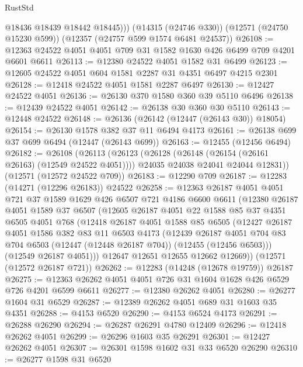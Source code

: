 \begin{lexlean}{RustStd}
\begin{coremodule}
          @18436
          @18439
          @18442
          @18445)))
    (@14315 (@24746 @330))
    (@12571 (@24750 @15230 @599))
    (@12357 (@24757 @599 @1574 @6481 @24537))
@26108 := @12363 @24522 @4051 @4051 @709 @31 @1582 @1630 @426 @6499 @709 @4201 @6601 @6611
@26113 := @12380 @24522 @4051 @1582 @31 @6499
@26123 := @12605 @24522 @4051 @604 @1581 @2287 @31 @4351 @6497 @4215 @2301
@26128 := @12418 @24522 @4051 @1581 @2287 @6497
@26130 := @12427 @24522 @4051
@26136 := @26130 @370 @1580 @360 @39 @5110 @6496
@26138 := @12439 @24522 @4051
@26142 := @26138 @30 @360 @30 @5110
@26143 := @12448 @24522
@26148 := @26136 (@26142 (@12447 (@26143 @30)) @18054)
@26154 := @26130 @1578 @382 @37 @11 @6494 @4173
@26161 := @26138 @699 @37 @699 @6494 (@12447 (@26143 @699))
@26163 := @12455 (@12456 @6494)
@26182 := @26108
    (@26113
      (@26123
        (@26128 (@26148 (@26154 (@26161 @26163) (@12549 @24522 @4051))))
        @24035
        @24038
        @24041
        @24044
        @12831))
    (@12571 (@12572 @24522 @709))
@26183 := @12290 @709
@26187 := @12283 (@14271 (@12296 @26183)) @24522
@26258 := @12363
    @26187
    @4051
    @4051
    @721
    @37
    @1589
    @1629
    @426
    @6507
    @721
    @4186
    @6600
    @6611
    (@12380
      @26187
      @4051
      @1589
      @37
      @6507
      (@12605
        @26187
        @4051
        @22
        @1588
        @85
        @37
        @4351
        @6505
        @4051
        @768
        (@12418
          @26187
          @4051
          @1588
          @85
          @6505
          (@12427
            @26187
            @4051
            @1586
            @382
            @83
            @11
            @6503
            @4173
            (@12439
              @26187
              @4051
              @704
              @83
              @704
              @6503
              (@12447 (@12448 @26187 @704))
              (@12455 (@12456 @6503)))
            (@12549 @26187 @4051)))
        @12647
        @12651
        @12655
        @12662
        @12669))
    (@12571 (@12572 @26187 @721))
@26262 := @12283 (@14248 (@12678 @19759)) @26187
@26275 := @12363 @26262 @4051 @4051 @726 @31 @1604 @1628 @426 @6529 @726 @4201 @6599 @6611
@26277 := @12380 @26262 @4051
@26280 := @26277 @1604 @31 @6529
@26287 := @12389 @26262 @4051 @689 @31 @1603 @35 @4351
@26288 := @4153 @6520
@26290 := @4153 @6524 @4173
@26291 := @26288 @26290
@26294 := @26287 @26291 @4780 @12409
@26296 := @12418 @26262 @4051
@26299 := @26296 @1603 @35 @26291
@26301 := @12427 @26262 @4051
@26307 := @26301 @1598 @1602 @31 @33 @6520 @26290
@26310 := @26277 @1598 @31 @6520

\end{coremodule}
\end{lexlean}
